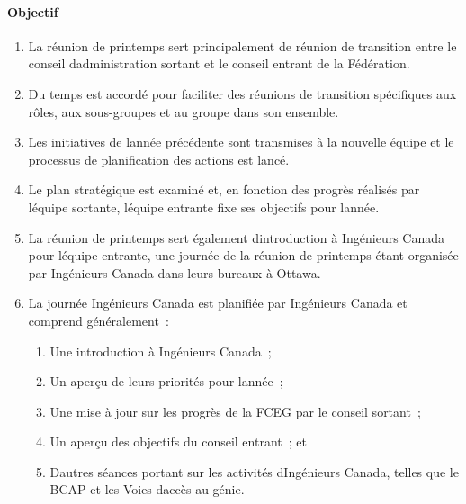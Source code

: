 \paragraph{Objectif}
\begin{enumerate}
 \item
  La réunion de printemps sert principalement de réunion de transition entre le conseil d\textquotesingle administration sortant et le conseil entrant de la Fédération.
 \item
  Du temps est accordé pour faciliter des réunions de transition spécifiques aux rôles, aux sous-groupes et au groupe dans son ensemble.
 \item
  Les initiatives de l\textquotesingle année précédente sont transmises à la nouvelle équipe et le processus de planification des actions est lancé.
 \item
  Le plan stratégique est examiné et, en fonction des progrès réalisés par l\textquotesingle équipe sortante, l\textquotesingle équipe entrante fixe ses objectifs pour l\textquotesingle année.
 \item
  La réunion de printemps sert également d\textquotesingle introduction à Ingénieurs Canada pour l\textquotesingle équipe entrante, une journée de la réunion de printemps étant organisée par Ingénieurs Canada dans leurs bureaux à Ottawa.
 \item
  La journée Ingénieurs Canada est planifiée par Ingénieurs Canada et comprend généralement~:

  \begin{enumerate}
   \item
    Une introduction à Ingénieurs Canada~;
   \item
    Un aperçu de leurs priorités pour l\textquotesingle année~;
   \item
    Une mise à jour sur les progrès de la FCEG par le conseil sortant~;
   \item
    Un aperçu des objectifs du conseil entrant~; et
   \item
    D\textquotesingle autres séances portant sur les activités d\textquotesingle Ingénieurs Canada, telles que le BCAP et les Voies d\textquotesingle accès au génie.
  \end{enumerate}

\end{enumerate}

